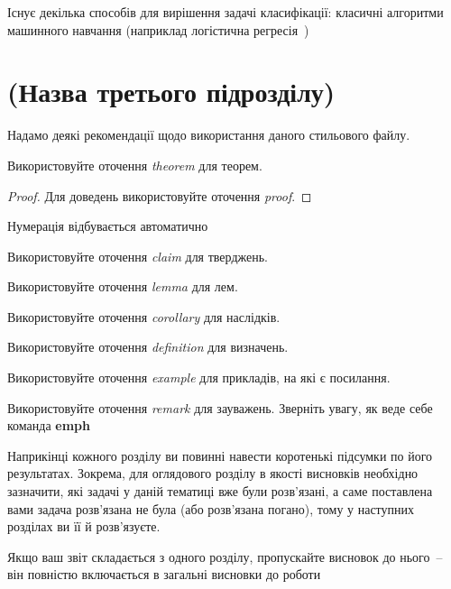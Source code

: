 Існує декілька способів для вирішення задачі класифікації: класичні алгоритми машинного навчання (наприклад логістична регресія~\cite{ct})

\section{(Назва третього підрозділу)}


Надамо деякі рекомендації щодо використання даного стильового файлу.

\begin{theorem}
Використовуйте оточення \emph{theorem} для теорем.
\end{theorem}
\begin{proof}
Для доведень використовуйте оточення \emph{proof}.
\end{proof}
\begin{theorem}
Нумерація відбувається автоматично
\end{theorem}
\begin{claim}
Використовуйте оточення \emph{claim} для тверджень.
\end{claim}
\begin{lemma}
Використовуйте оточення \emph{lemma} для лем.
\end{lemma}
\begin{corollary}
Використовуйте оточення \emph{corollary} для наслідків.
\end{corollary}
\begin{definition}
Використовуйте оточення \emph{definition} для визначень.
\end{definition}
\begin{example}
Використовуйте оточення \emph{example} для прикладів, на які є посилання.
\end{example}
\begin{remark}
Використовуйте оточення \emph{remark} для зауважень. Зверніть увагу, як 
веде себе команда \textbf{emph}
\end{remark}


\chapconclude{\ref{chap:review}}

Наприкінці кожного розділу ви повинні навести коротенькі підсумки по його 
результатах. Зокрема, для оглядового розділу в якості висновків необхідно 
зазначити, які задачі у даній тематиці вже були розв'язані, а саме 
поставлена вами задача розв'язана не була (або розв'язана погано), тому у 
наступних розділах ви її й розв'язуєте.

Якщо ваш звіт складається з одного розділу, пропускайте висновок до 
нього~-- він повністю включається в загальні висновки до роботи
